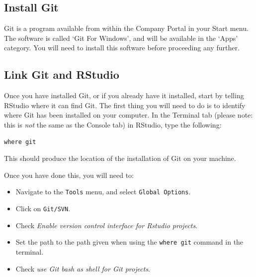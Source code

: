 \documentclass[
  letterpaper,
]{book}
\providecommand{\tightlist}{%
  \setlength{\itemsep}{0pt}\setlength{\parskip}{0pt}}\usepackage{longtable,booktabs,array}
\begin{document}
\begin{tcolorbox}[enhanced jigsaw, toprule=.15mm, left=2mm, colback=white, breakable, title=\textcolor{quarto-callout-note-color}{\faInfo}\hspace{0.5em}{Install Git and Configure Github}, colframe=quarto-callout-note-color-frame, opacitybacktitle=0.6, coltitle=black, titlerule=0mm, bottomrule=.15mm, rightrule=.15mm, bottomtitle=1mm, toptitle=1mm, arc=.35mm, leftrule=.75mm, opacityback=0, colbacktitle=quarto-callout-note-color!10!white]

\hypertarget{install-git}{%
\subsection{Install Git}\label{install-git}}

Git is a program available from within the Company Portal in your Start
menu. The software is called `Git For Windows', and will be available in
the `Apps' category. You will need to install this software before
proceeding any further.

\hypertarget{link-git-and-rstudio}{%
\subsection{Link Git and RStudio}\label{link-git-and-rstudio}}

Once you have installed Git, or if you already have it installed, start
by telling RStudio where it can find Git. The first thing you will need
to do is to identify where Git has been installed on your computer. In
the Terminal tab (please note: this is \emph{not} the same as the
Console tab) in RStudio, type the following:

\begin{verbatim}
where git
\end{verbatim}

This should produce the location of the installation of Git on your
machine.

Once you have done this, you will need to:

\begin{itemize}
\tightlist
\item
  Navigate to the \texttt{Tools} menu, and select
  \texttt{Global\ Options}.
\item
  Click on \texttt{Git/SVN}.
\item
  Check \emph{Enable version control interface for Rstudio projects}.
\item
  Set the path to the path given when using the \texttt{where\ git}
  command in the terminal.
\item
  Check \emph{use Git bash as shell for Git projects}.
\end{itemize}


\end{tcolorbox}
\end{document}
